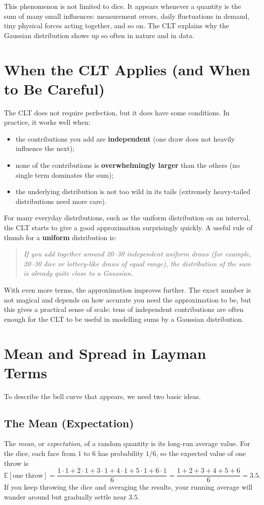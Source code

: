 This phenomenon is not limited to dice.  It appears whenever a quantity is the sum of many small influences: measurement errors, daily fluctuations in demand, tiny physical forces acting together, and so on.  The CLT explains why the Gaussian distribution shows up so often in nature and in data.

\section{When the CLT Applies (and When to Be Careful)}
The CLT does not require perfection, but it does have some conditions.  In practice, it works well when:
\begin{itemize}
  \item the contributions you add are \textbf{independent} (one draw does not heavily influence the next);
  \item none of the contributions is \textbf{overwhelmingly larger} than the others (no single term dominates the sum);
  \item the underlying distribution is not too wild in its tails (extremely heavy-tailed distributions need more care).
\end{itemize}

For many everyday distributions, such as the uniform distribution on an interval, the CLT starts to give a good approximation surprisingly quickly.  A useful rule of thumb for a \textbf{uniform} distribution is:
\begin{quote}
  \emph{If you add together around 20--30 independent uniform draws (for example, 20--30 dice or lottery-like draws of equal range), the distribution of the sum is already quite close to a Gaussian.}
\end{quote}

With even more terms, the approximation improves further.  The exact number is not magical and depends on how accurate you need the approximation to be, but this gives a practical sense of scale: tens of independent contributions are often enough for the CLT to be useful in modelling sums by a Gaussian distribution.

\section{Mean and Spread in Layman Terms}
To describe the bell curve that appears, we need two basic ideas.

\subsection{The Mean (Expectation)}
The \emph{mean}, or \emph{expectation}, of a random quantity is its long-run average value.  For the dice, each face from \(1\) to \(6\) has probability \(1/6\), so the expected value of one throw is
\[
  \mathbb{E}[\text{one throw}] = \frac{1\cdot 1 + 2\cdot 1 + 3\cdot 1 + 4\cdot 1 + 5\cdot 1 + 6\cdot 1}{6}
  = \frac{1+2+3+4+5+6}{6} = 3.5.
\]
If you keep throwing the dice and averaging the results, your running average will wander around but gradually settle near \(3.5\).

